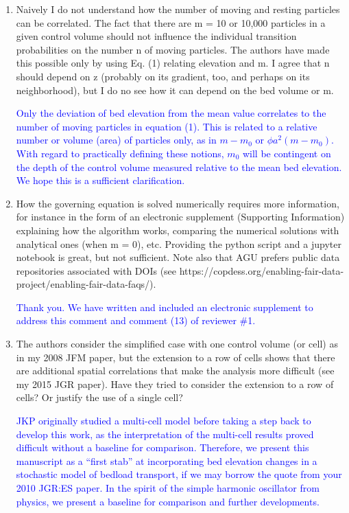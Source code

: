 \documentclass[11pt]{article}
\begin{document}
\begin{enumerate}
\item Naively I do not understand how the number of moving and resting particles can be correlated. The fact that there are m = 10 or 10,000 particles in a given control volume should not influence the individual transition probabilities on the number n of moving particles. The authors have made this possible only by using Eq. (1) relating elevation and m. I agree that n should depend on z (probably on its gradient, too, and perhaps on its neighborhood), but I do no see how it can depend on the bed volume or m.

\textcolor{blue}{Only the deviation of bed elevation from the mean value correlates to the number of moving particles in equation (1). This is related to a relative number or volume (area) of particles only, as in $m-m_0$ or $\phi a^2(m-m_0)$. With regard to practically defining these notions, $m_0$ will be contingent on the depth of the control volume measured relative to the mean bed elevation. We hope this is a sufficient clarification.}

\item How the governing equation is solved numerically requires more information, for instance in the form of an electronic supplement (Supporting Information) explaining how the algorithm works, comparing the numerical solutions with analytical ones (when m = 0), etc. Providing the python script and a jupyter notebook is great, but not sufficient. Note also that AGU prefers public data repositories associated with DOIs (see https://copdess.org/enabling-fair-data-project/enabling-fair-data-faqs/).

\textcolor{blue}{Thank you. We have written and included an electronic supplement to address this comment and comment (13) of reviewer \#1.}

\item The authors consider the simplified case with one control volume (or cell) as in my 2008 JFM paper, but the extension to a row of cells shows that there are additional spatial correlations that make the analysis more difficult (see my 2015 JGR paper). Have they tried to consider the extension to a row of cells? Or justify the use of a single cell?

\textcolor{blue}{JKP originally studied a multi-cell model before taking a step back to develop this work, as the interpretation of the multi-cell results proved difficult without a baseline for comparison. Therefore, we present this manuscript as a ``first stab'' at incorporating bed elevation changes in a stochastic model of bedload transport, if we may borrow the quote from your 2010 JGR:ES paper. In the spirit of the simple harmonic oscillator from physics, we present a baseline for comparison and further developments.}


\end{enumerate}
\end{document}
